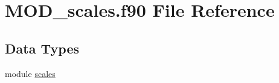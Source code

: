 \hypertarget{MOD__scales_8f90}{\section{M\-O\-D\-\_\-scales.\-f90 File Reference}
\label{MOD__scales_8f90}
}
\subsection*{Data Types}
\begin{DoxyCompactItemize}
\item 
module \hyperlink{classscales}{scales}
\end{DoxyCompactItemize}
